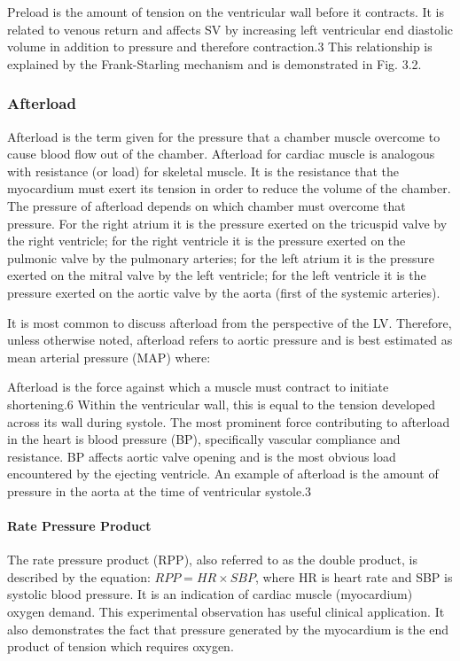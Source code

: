 
Preload is the amount of tension on the ventricular wall before it contracts. It is related to venous return and affects SV by increasing left ventricular end diastolic volume in addition to pressure and therefore contraction.3 This relationship is explained by the Frank-Starling mechanism and is demonstrated in Fig. 3.2.

\subsubsection{Afterload}
Afterload is the term given for the pressure that a chamber muscle overcome to cause blood flow out of the chamber. Afterload for cardiac muscle is analogous with resistance (or load) for skeletal muscle. It is the resistance that the myocardium must exert its tension in order to reduce the volume of the chamber. The pressure of afterload depends on which chamber must overcome that pressure. For the right atrium it is the pressure exerted on the tricuspid valve by the right ventricle; for the right ventricle it is the pressure exerted on the pulmonic valve by the pulmonary arteries; for the left atrium it is the pressure exerted on the mitral valve by the left ventricle; for the left ventricle it is the pressure exerted on the aortic valve by the aorta (first of the systemic arteries). 

It is most common to discuss afterload from the perspective of the LV. Therefore, unless otherwise noted, afterload refers to aortic pressure and is best estimated as mean arterial pressure (MAP) where: 



Afterload is the force against which a muscle must contract to initiate shortening.6 Within the ventricular wall, this is equal to the tension developed across its wall during systole. The most prominent force contributing to afterload in the heart is blood pressure (BP), specifically vascular compliance and resistance. BP affects aortic valve opening and is the most obvious load encountered by the ejecting ventricle. An example of afterload is the amount of pressure in the aorta at the time of ventricular systole.3


\paragraph{Rate Pressure Product}

The rate pressure product (RPP), also referred to as the double product, is described by the equation: $RPP = HR \times SBP$, where HR is heart rate and SBP is systolic blood pressure. It is an indication of cardiac muscle (myocardium) oxygen demand. This experimental observation has useful clinical application. It also demonstrates the fact that pressure generated by the myocardium is the end product of tension which requires oxygen.

